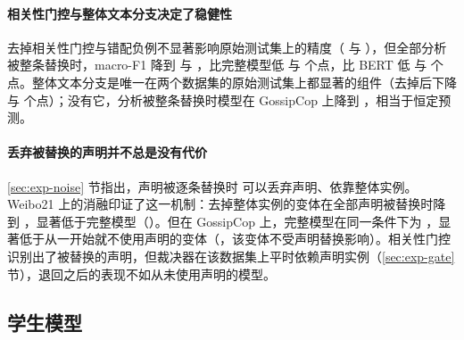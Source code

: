\paragraph{相关性门控与整体文本分支决定了稳健性}
去掉相关性门控与错配负例不显著影响原始测试集上的精度（ 与 ），但全部分析被整条替换时，macro-F1 降到  与 ，比完整模型低  与  个点，比 BERT 低  与  个点。整体文本分支是唯一在两个数据集的原始测试集上都显著的组件（去掉后下降  与  个点）；没有它，分析被整条替换时模型在 GossipCop 上降到 ，相当于恒定预测。

\paragraph{丢弃被替换的声明并不总是没有代价}
\ref{sec:exp-noise} 节指出，声明被逐条替换时 \method{} 可以丢弃声明、依靠整体实例。Weibo21 上的消融印证了这一机制：去掉整体实例的变体在全部声明被替换时降到 ，显著低于完整模型（）。但在 GossipCop 上，完整模型在同一条件下为 ，显著低于从一开始就不使用声明的变体（，该变体不受声明替换影响）。相关性门控识别出了被替换的声明，但裁决器在该数据集上平时依赖声明实例（\ref{sec:exp-gate} 节），退回之后的表现不如从未使用声明的模型。

\subsection{学生模型}\label{sec:exp-distill}

\begin{table}[!htbp]
\centering\small
\caption{推理时不调用 LLM 的学生模型（macro-F1，\%，3 个种子）。“其教师”为同一次运行中训练的教师模型的结果。$^{*}$ 表示与同样种子的 BERT 相比差异显著。}\label{tab:distill}
\end{table}

